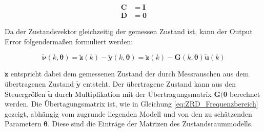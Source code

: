 \begin{align}
	\mathbf{C} &= \mathbf{I} \nonumber \\
 	\mathbf{D} &= \mathbf{0}          
	\label{eq:CD}
\end{align}

Da der Zustandsvektor gleichzeitig der gemessen Zustand ist, kann der Output Error folgendermaßen formuliert werden:

\begin{equation}
    \mathbf{\tilde{\nu}}(k,\mathbf{\theta}) = \mathbf{\tilde{z}}(k)-\mathbf{\tilde{y}}(k,\mathbf{\theta}) = \mathbf{\tilde{z}}(k)-\mathbf{G}(k,\mathbf{\theta})\mathbf{\tilde{u}}(k)  
	\label{eq:Output_Error}
\end{equation}

$\mathbf{\tilde{z}}$ entspricht dabei dem gemessenen Zustand der durch Messrauschen aus dem übertragenen Zustand $\mathbf{\tilde{y}}$ entsteht. Der übertragene Zustand kann aus den Steuergrößen $\mathbf{\tilde{u}}$ durch Multiplikation mit der Übertragungsmatrix $\mathbf{G}(\mathbf{\theta}$ berechnet werden. Die Übertagungsmatrix ist, wie in Gleichung \ref{eq:ZRD_Frequenzbereich} gezeigt, abhängig vom zugrunde liegenden Modell und von den zu schätzenden Parametern $\mathbf{\theta}$. Diese sind die Einträge der Matrizen des Zustandsraummodells.   

